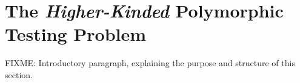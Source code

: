 \documentclass{llncs}
\begin{document}
\section{The \emph{Higher-Kinded} Polymorphic Testing Problem}








FIXME: Introductory paragraph, explaining the purpose and structure of
this section.

\end{document}
